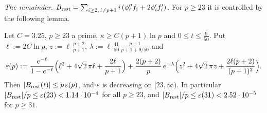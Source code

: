 \emph{The remainder.} $B_{\rm rest}=\sum_{i\ge2,\,i\ne p+1}i\,(\phi_i''f_i+2\phi_i'f_i')$. For $p\ge23$ it is controlled by the following lemma.

\begin{lemma}\label{lem:remainder}
Let $C=3.25$, $p\ge23$ a prime, $\kappa\ge C(p+1)\ln p$ and $0\le t\le\tfrac9{50}$. Put $\ell:=2C\ln p$, $z:=\ell\,\tfrac{p+2}{p+1}$, $\lambda:=\ell\,\tfrac{41}{50}\,\tfrac{p+1}{p+1+9/50}$ and
\[
\varepsilon(p):=\frac{e^{-\ell}}{1-e^{-\ell}}\Bigl(\ell^2+4\sqrt2\,\pi\ell+\frac{2\ell}{p+1}\Bigr)+\frac{2(p+2)}{p}\,e^{-\lambda}\Bigl(z^2+4\sqrt2\,\pi z+\frac{2\ell(p+2)}{(p+1)^2}\Bigr).
\]
Then $|B_{\rm rest}(t)|\le p\,\varepsilon(p)$, and $\varepsilon$ is decreasing on $[23,\infty)$. In particular $|B_{\rm rest}|/p\le\varepsilon(23)<1.14\cdot10^{-4}$ for all $p\ge23$, and $|B_{\rm rest}|/p\le\varepsilon(31)<2.52\cdot10^{-5}$ for $p\ge31$.
\end{lemma}
